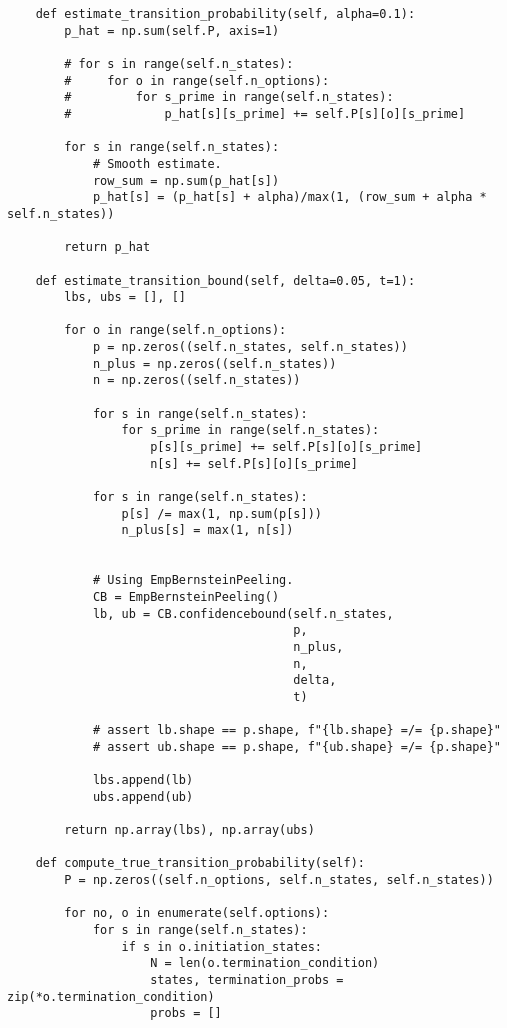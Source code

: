 \begin{verbatim}
    def estimate_transition_probability(self, alpha=0.1):
        p_hat = np.sum(self.P, axis=1)

        # for s in range(self.n_states):
        #     for o in range(self.n_options):
        #         for s_prime in range(self.n_states):
        #             p_hat[s][s_prime] += self.P[s][o][s_prime]

        for s in range(self.n_states):
            # Smooth estimate.
            row_sum = np.sum(p_hat[s])
            p_hat[s] = (p_hat[s] + alpha)/max(1, (row_sum + alpha * self.n_states))

        return p_hat

    def estimate_transition_bound(self, delta=0.05, t=1):
        lbs, ubs = [], []

        for o in range(self.n_options):
            p = np.zeros((self.n_states, self.n_states))
            n_plus = np.zeros((self.n_states))
            n = np.zeros((self.n_states))

            for s in range(self.n_states):
                for s_prime in range(self.n_states):
                    p[s][s_prime] += self.P[s][o][s_prime]
                    n[s] += self.P[s][o][s_prime]

            for s in range(self.n_states):
                p[s] /= max(1, np.sum(p[s]))
                n_plus[s] = max(1, n[s])


            # Using EmpBernsteinPeeling.
            CB = EmpBernsteinPeeling()
            lb, ub = CB.confidencebound(self.n_states,
                                        p,
                                        n_plus,
                                        n,
                                        delta,
                                        t)

            # assert lb.shape == p.shape, f"{lb.shape} =/= {p.shape}"
            # assert ub.shape == p.shape, f"{ub.shape} =/= {p.shape}"

            lbs.append(lb)
            ubs.append(ub)

        return np.array(lbs), np.array(ubs)

    def compute_true_transition_probability(self):
        P = np.zeros((self.n_options, self.n_states, self.n_states))

        for no, o in enumerate(self.options):
            for s in range(self.n_states):
                if s in o.initiation_states:
                    N = len(o.termination_condition)
                    states, termination_probs = zip(*o.termination_condition)
                    probs = []


\end{verbatim}
